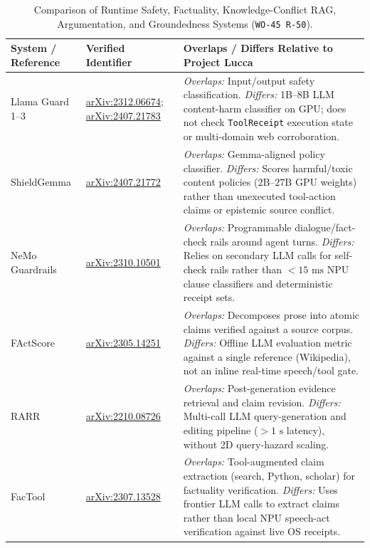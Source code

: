 \documentclass[11pt,a4paper]{article}
\begin{document}
\begin{table}[h]
\centering
\scriptsize
\caption{Comparison of Runtime Safety, Factuality, Knowledge-Conflict RAG, Argumentation, and Groundedness Systems (\texttt{WO-45 R-50}).}
\label{tab:related_work_r50}
\begin{tabular}{p{2.7cm}p{2.9cm}p{8.8cm}}
\toprule
\textbf{System / Reference} & \textbf{Verified Identifier} & \textbf{Overlaps / Differs Relative to Project Lucca} \\
\midrule
Llama Guard 1--3 \cite{inan2023llamaguard,dubey2024llama3} & \href{https://arxiv.org/abs/2312.06674}{arXiv:2312.06674}; \href{https://arxiv.org/abs/2407.21783}{arXiv:2407.21783} & \emph{Overlaps:} Input/output safety classification. \emph{Differs:} 1B--8B LLM content-harm classifier on GPU; does not check \texttt{ToolReceipt} execution state or multi-domain web corroboration. \\
ShieldGemma \cite{zeng2024shieldgemma} & \href{https://arxiv.org/abs/2407.21772}{arXiv:2407.21772} & \emph{Overlaps:} Gemma-aligned policy classifier. \emph{Differs:} Scores harmful/toxic content policies ($2\text{B}$--$27\text{B}$ GPU weights) rather than unexecuted tool-action claims or epistemic source conflict. \\
NeMo Guardrails \cite{rebedea2023nemo} & \href{https://arxiv.org/abs/2310.10501}{arXiv:2310.10501} & \emph{Overlaps:} Programmable dialogue/fact-check rails around agent turns. \emph{Differs:} Relies on secondary LLM calls for self-check rails rather than $<15\text{ ms}$ NPU clause classifiers and deterministic receipt sets. \\
FActScore \cite{min2023factscore} & \href{https://arxiv.org/abs/2305.14251}{arXiv:2305.14251} & \emph{Overlaps:} Decomposes prose into atomic claims verified against a source corpus. \emph{Differs:} Offline LLM evaluation metric against a single reference (Wikipedia), not an inline real-time speech/tool gate. \\
RARR \cite{gao2023rarr} & \href{https://arxiv.org/abs/2210.08726}{arXiv:2210.08726} & \emph{Overlaps:} Post-generation evidence retrieval and claim revision. \emph{Differs:} Multi-call LLM query-generation and editing pipeline ($>1\text{ s}$ latency), without 2D query-hazard scaling. \\
FacTool \cite{chern2023factool} & \href{https://arxiv.org/abs/2307.13528}{arXiv:2307.13528} & \emph{Overlaps:} Tool-augmented claim extraction (search, Python, scholar) for factuality verification. \emph{Differs:} Uses frontier LLM calls to extract claims rather than local NPU speech-act verification against live OS receipts. \\

\end{tabular}
\end{table}
\end{document}
